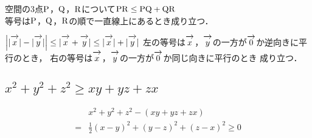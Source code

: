 \documentclass[twocolumn]{ltjsarticle}
\renewcommand{\v}[1]{\overrightarrow{\mathstrut{#1}}}
\begin{document}
\begin{lineup}
  空間の3点$\rm{P}$，$\rm{Q}$，$\rm{R}$について$\rm{PR}\leq \rm{PQ} + \rm{QR}$\\
  等号は$\rm{P}$，$\rm{Q}$，$\rm{R}$の順で一直線上にあるとき成り立つ．\\
\end{lineup}

\begin{lineup}
  $\Bigl||\v{x}|-|\v{y}|\Bigr| \leq |\v{x} + \v{y}| \leq |\v{x}| + |\v{y}|$
  \baselineskip
  左の等号は$\v{x}$，$\v{y}$の一方が$\v{0}$か逆向きに平行のとき，
  右の等号は$\v{x}$，$\v{y}$の一方が$\v{0}$か同じ向きに平行のとき
  成り立つ．
\end{lineup}

\subsection{$x^2 + y^2 + z^2 \geq xy + yz + zx$}
\begin{syoumei*}
  \begin{fleqn}[20pt]
    \begin{align*}
      & x^2 + y^2 + z^2 - (xy + yz + zx)\\
      =& \frac{1}{2} {(x-y)^2 + (y-z)^2 + (z-x)^2} \geq 0
    \end{align*}
  \end{fleqn}
\end{syoumei*}
\end{document}
